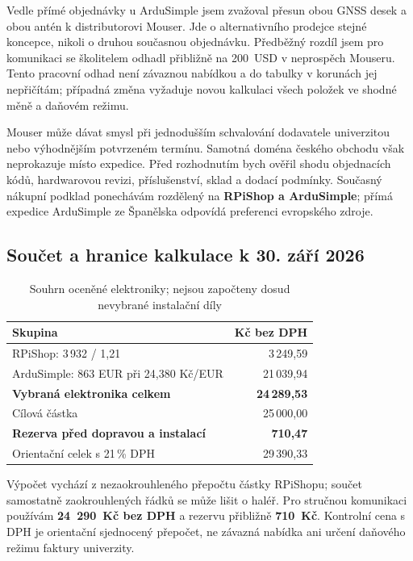 Vedle přímé objednávky u ArduSimple jsem zvažoval přesun obou GNSS desek
a obou antén k distributorovi Mouser. Jde o alternativního prodejce
stejné koncepce, nikoli o druhou současnou objednávku. Předběžný rozdíl
jsem pro komunikaci se školitelem odhadl přibližně na 200~USD v neprospěch
Mouseru. Tento pracovní odhad není závaznou nabídkou a do tabulky
v korunách jej nepřičítám; případná změna vyžaduje novou kalkulaci všech
položek ve shodné měně a daňovém režimu.

Mouser může dávat smysl při jednodušším schvalování dodavatele univerzitou
nebo výhodnějším potvrzeném termínu. Samotná doména českého obchodu však
neprokazuje místo expedice. Před rozhodnutím bych ověřil shodu objednacích
kódů, hardwarovou revizi, příslušenství, sklad a dodací podmínky.
Současný nákupní podklad ponechávám rozdělený na \textbf{RPiShop a
ArduSimple}; přímá expedice ArduSimple ze Španělska odpovídá preferenci
evropského zdroje.\cite{ardusimple-faq}

\subsection{Součet a hranice kalkulace k 30. září 2026}

\begin{table}[htbp]
  \centering
  \small
  \caption{Souhrn oceněné elektroniky; nejsou započteny dosud nevybrané instalační díly}
  \label{tab:budget-2026}
  \begin{tabularx}{\textwidth}{@{}Yr@{}}
    \toprule
    Skupina & Kč bez DPH \\
    \midrule
    RPiShop: 3\,932 / 1,21 & 3\,249,59 \\
    ArduSimple: 863 EUR při 24,380 Kč/EUR & 21\,039,94 \\
    \textbf{Vybraná elektronika celkem} & \textbf{24\,289,53} \\
    Cílová částka & 25\,000,00 \\
    \textbf{Rezerva před dopravou a instalací} & \textbf{710,47} \\
    \midrule
    Orientační celek s 21\,\% DPH & 29\,390,33 \\
    \bottomrule
  \end{tabularx}
\end{table}

Výpočet vychází z nezaokrouhleného přepočtu částky RPiShopu; součet samostatně
zaokrouhlených řádků se může lišit o haléř. Pro stručnou komunikaci používám
\textbf{24~290~Kč bez DPH} a rezervu přibližně \textbf{710~Kč}.
Kontrolní cena s DPH je orientační sjednocený přepočet, ne závazná nabídka
ani určení daňového režimu faktury univerzity.

